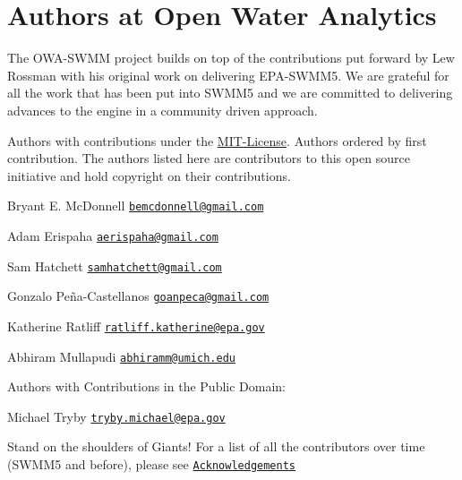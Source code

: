 \hypertarget{group___a_u_t_h_o_r_s}{}\section{Authors at Open Water Analytics}
\label{group___a_u_t_h_o_r_s}
The O\+W\+A-\/\+S\+W\+MM project builds on top of the contributions put forward by Lew Rossman with his original work on delivering E\+P\+A-\/\+S\+W\+M\+M5. We are grateful for all the work that has been put into S\+W\+M\+M5 and we are committed to delivering advances to the engine in a community driven approach.

Authors with contributions under the \hyperlink{group___m_i_t-_license}{M\+I\+T-\/\+License}. Authors ordered by first contribution. The authors listed here are contributors to this open source initiative and hold copyright on their contributions.


\begin{DoxyItemize}
\item Bryant E. Mc\+Donnell \href{mailto:bemcdonnell@gmail.com}{\tt bemcdonnell@gmail.\+com}
\item Adam Erispaha \href{mailto:aerispaha@gmail.com}{\tt aerispaha@gmail.\+com}
\item Sam Hatchett \href{mailto:samhatchett@gmail.com}{\tt samhatchett@gmail.\+com}
\item Gonzalo Peña-\/\+Castellanos \href{mailto:goanpeca@gmail.com}{\tt goanpeca@gmail.\+com}
\item Katherine Ratliff \href{mailto:ratliff.katherine@epa.gov}{\tt ratliff.\+katherine@epa.\+gov}
\item Abhiram Mullapudi \href{mailto:abhiramm@umich.edu}{\tt abhiramm@umich.\+edu}
\end{DoxyItemize}

Authors with Contributions in the Public Domain\+:
\begin{DoxyItemize}
\item Michael Tryby \href{mailto:tryby.michael@epa.gov}{\tt tryby.\+michael@epa.\+gov}
\end{DoxyItemize}

Stand on the shoulders of Giants! For a list of all the contributors over time (S\+W\+M\+M5 and before), please see \href{https://github.com/OpenWaterAnalytics/Stormwater-Management-Model/wiki/Acknowledgements}{\tt Acknowledgements} 